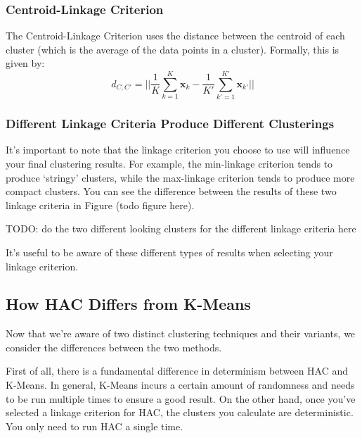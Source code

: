 \subsubsection{Centroid-Linkage Criterion}
The Centroid-Linkage Criterion uses the distance between the centroid of each cluster (which is the average of the data points in a cluster). Formally, this is given by:
\begin{equation} \label{cent-linkage-crit}
	d_{C, C'} = || \frac{1}{K} \sum_{k=1}^{K} \textbf{x}_{k} - \frac{1}{K'} \sum_{k'=1}^{K'} \textbf{x}_{k'} ||
\end{equation}

\subsubsection{Different Linkage Criteria Produce Different Clusterings}
It's important to note that the linkage criterion you choose to use will influence your final clustering results. For example, the min-linkage criterion tends to produce `stringy' clusters, while the max-linkage criterion tends to produce more compact clusters. You can see the difference between the results of these two linkage criteria in Figure (todo figure here).

TODO: do the two different looking clusters for the different linkage criteria here

It's useful to be aware of these different types of results when selecting your linkage criterion.


\subsection{How HAC Differs from K-Means}
Now that we're aware of two distinct clustering techniques and their variants, we consider the differences between the two methods.

First of all, there is a fundamental difference in determinism between HAC and K-Means. In general, K-Means incurs a certain amount of randomness and needs to be run multiple times to ensure a good result. On the other hand, once you've selected a linkage criterion for HAC, the clusters you calculate are deterministic. You only need to run HAC a single time.

